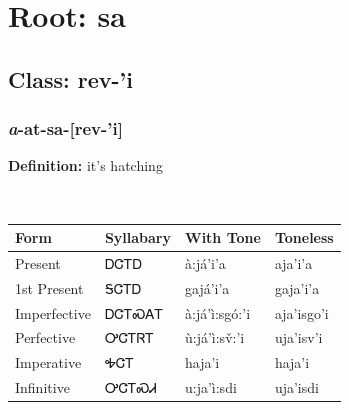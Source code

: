 \needspace{4in}
\section*{Root: sa}
\nopagebreak
{}
\needspace{3in}
\subsection*{Class: rev-'i}
\nopagebreak
\needspace{2in}
\subsubsection*{\textit{a}{-}at{-}\textbf{sa}{-}[rev-'i]}
\nopagebreak
\textbf{Definition: } it{\textquoteright}s hatching
\\[0.5em]
\begin{tabularx}{\textwidth}{l X X X}%
\toprule%
\textbf{Form}&\textbf{Syllabary}&\textbf{With Tone}&\textbf{Toneless}\\%
\midrule%
Present&ᎠᏣᎢᎠ&à:já’i’a&aja’i’a\\%
1st Present&ᎦᏣᎢᎠ&gajá’i’a&gaja’i’a\\%
Imperfective&ᎠᏣᎢᏍᎪᎢ&à:já’ì:sgó:’i&aja’isgo’i\\%
Perfective&ᎤᏣᎢᏒᎢ&ù:já’ì:sv̌:’i&uja’isv’i\\%
Imperative&ᎭᏣᎢ&haja’i&haja’i\\%
Infinitive&ᎤᏣᎢᏍᏗ&u:ja’ì:sdi&uja’isdi\\%
\bottomrule%
\end{tabularx}
\\[1em]